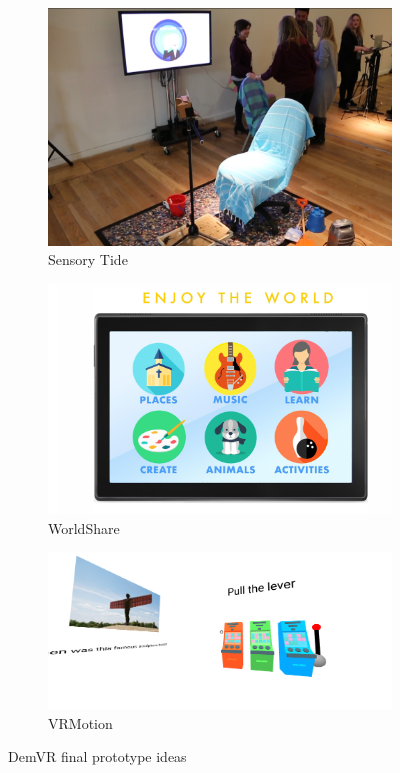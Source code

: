 \begin{figure}[htbp]
\begin{subfigure}[t]{0.3\textwidth}
    \includegraphics[width=\linewidth]{Images/SensoryTides.png}
\caption{Sensory Tide}
\label{fig:SensoryTide}
\end{subfigure}\hfill
\begin{subfigure}[t]{0.3\textwidth}
    \includegraphics[width=\linewidth]{Images/WorldShare.png}
\caption{WorldShare}
\label{fig:WorldShare}
\end{subfigure}\hfill
\begin{subfigure}[t]{0.3\textwidth}
    \includegraphics[width=\linewidth]{Images/VRMotion.png}
\caption{VRMotion}
\label{fig:VRMotion}
\end{subfigure}
\caption{DemVR final prototype ideas}
\label{fig:DemVRFinalIdeas}
\end{figure}
